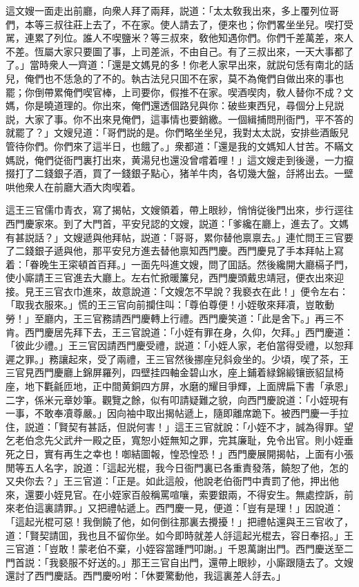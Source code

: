 這文嫂一面走出前廳，向衆人拜了兩拜，説道：「太太敎我出來，多上覆列位哥們，本等三叔往莊上去了，不在家。使人請去了，便來也；你們畧坐坐兒。喫打受駡，連累了列位。誰人不喫鹽米？等三叔來，敎他知遇你們。你們千差萬差，來人不差。恆屬大家只要圖了事，上司差派，不由自己。有了三叔出來，一天大事都了了。」當時衆人一齊道：「還是文媽見的多！你老人家早出來，就説句恁有南北的話兒，俺們也不恁急的了不的。執古法兒只囬不在家，莫不為俺們自做出來的事也罷；你倒帶累俺們喫官棒，上司要你，假推不在家。喫酒喫肉，敎人替你不成？文媽，你是曉道理的。你出來，俺們還透個路兒與你：破些東西兒，尋個分上兒説説，大家了事。你不出來見俺們，這事情也要銷繳。一個緝捕問刑衙門，平不答的就罷了？」文嫂兒道：「哥們説的是。你們略坐坐兒，我對太太説，安排些酒飯兒管待你們。你們來了這半日，也餓了。」衆都道：「還是我的文媽知人甘苦。不瞞文媽説，俺們従衙門裏打出來，黄湯兒也還没曾嚐着哩！」這文嫂走到後邊，一力攛掇打了二錢銀子酒，買了一錢銀子點心，猪羊牛肉，各切幾大盤，㧱將出去。一壁哄他衆人在前廳大酒大肉喫着。

這王三官儒巾青衣，寫了揭帖，文嫂領着，帶上眼紗，悄悄従後門出來，步行逕往西門慶家來。到了大門首，平安兒認的文嫂，説道：「爹纔在廳上，進去了。文媽有甚説話？」文嫂遞與他拜帖，説道：「哥哥，累你替他禀禀去。」連忙問王三官要了二錢銀子遞與他，那平安兒方進去替他禀知西門慶。西門慶見了手本拜帖上寫着：「眷晚生王寀頓首百拜。」一面先呌進文嫂，問了囬話。然後纔開大廳槅子門，使小廝請王三官進去大廳上。左右忙掀暖簾兒，西門慶頭戴忠靖冠，便衣出來迎接。見王三官衣巾進來，故意說道：「文嫂怎不早說？我褻衣在此！」便令左右：「取我衣服來。」慌的王三官向前攔住叫：「尊伯尊便！小姪敬來拜凟，豈敢動勞！」至廳内，王三官務請西門慶轉上行禮。西門慶笑道：「此是舍下。」再三不肯。西門慶居先拜下去，王三官說道：「小姪有罪在身，久仰，欠拜。」西門慶道：「彼此少禮。」王三官因請西門慶受禮，説道：「小姪人家，老伯當得受禮，以恕拜遲之罪。」務讓起來，受了兩禮，王三官然後挪座兒斜僉坐的。少頃，喫了茶，王三官見西門慶廳上錦屏羅列，四壁挂四軸金碧山水，座上鋪着緑錦緞镶嵌貂鼠椅座，地下氍毹匝地，正中間黄銅四方屏，水磨的耀目爭輝，上面牌扁下書「承恩」二字，係米元章妙筆。觀覽之餘，似有叩請疑難之貌，向西門慶說道：「小姪現有一事，不敢奉凟尊嚴。」因向袖中取出揭帖遞上，隨即離席跪下。被西門慶一手拉住，説道：「賢契有甚話，但説何害！」這王三官就說：「小姪不才，誠為得罪。望乞老伯念先父武弁一殿之臣，寬恕小姪無知之罪，完其廉耻，免令出官。則小姪垂死之日，實有再生之幸也！啣結圖報，惶恐惶恐！」西門慶展開揭帖，上面有小張閒等五人名字，說道：「這起光棍，我今日衙門裏已各重責發落，饒恕了他，怎的又央你去？」王三官道：「正是。如此這般，他說老伯衙門中責罰了他，押出他來，還要小姪見官。在小姪家百般稱罵喧嚷，索要銀兩，不得安生。無處控訴，前來老伯這裏請罪。」又把禮帖遞上。西門慶一見，便道：「豈有是理！」因說道：「這起光棍可惡！我倒饒了他，如何倒往那裏去攪擾！」把禮帖還與王三官收了，道：「賢契請囬，我也且不留你坐。如今即時就差人㧱這起光棍去，容日奉招。」王三官道：「豈敢！蒙老伯不棄，小姪容當踵門叩謝。」千恩萬謝出門。西門慶送至二門首説：「我褻服不好送的。」那王三官自出門，還帶上眼紗，小廝跟隨去了。文嫂還討了西門慶話。西門慶吩咐：「休要驚動他，我這裏差人㧱去。」


